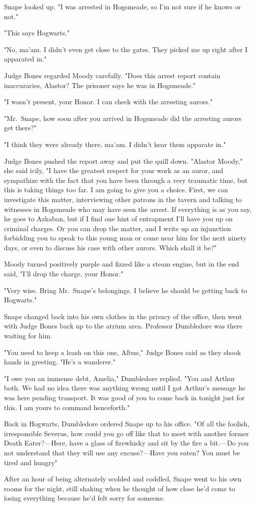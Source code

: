 Snape looked up. "I was arrested in Hogsmeade, so I'm not sure if he knows or not."

"This says Hogwarts."

"No, ma'am. I didn't even get close to the gates. They picked me up right after I apparated in."

Judge Bones regarded Moody carefully. "Does this arrest report contain inaccuracies, Alastor? The prisoner says he was in Hogsmeade."

"I wasn't present, your Honor. I can check with the arresting aurors."

"Mr.~Snape, how soon after you arrived in Hogsmeade did the arresting aurors get there?"

"I think they were already there, ma'am. I didn't hear them apparate in."

Judge Bones pushed the report away and put the quill down. "Alastor Moody," she said icily, "I have the greatest respect for your work as an auror, and sympathize with the fact that you have been through a very traumatic time, but this is taking things too far. I am going to give you a choice. First, we can investigate this matter, interviewing other patrons in the tavern and talking to witnesses in Hogsmeade who may have seen the arrest. If everything is as you say, he goes to Azkaban, but if I find one hint of entrapment I'll have you up on criminal charges. Or you can drop the matter, and I write up an injunction forbidding you to speak to this young man or come near him for the next ninety days, or even to discuss his case with other aurors. Which shall it be?"

Moody turned positively purple and fizzed like a steam engine, but in the end said, "I'll drop the charge, your Honor."

"Very wise. Bring Mr.~Snape's belongings. I believe he should be getting back to Hogwarts."

Snape changed back into his own clothes in the privacy of the office, then went with Judge Bones back up to the atrium area. Professor Dumbledore was there waiting for him.

"You need to keep a leash on this one, Albus," Judge Bones said as they shook hands in greeting. "He's a wanderer."

"I owe you an immense debt, Amelia," Dumbledore replied. "You and Arthur both. We had no idea there was anything wrong until I got Arthur's message he was here pending transport. It was good of you to come back in tonight just for this. I am yours to command henceforth."

Back in Hogwarts, Dumbledore ordered Snape up to his office. "Of all the foolish, irresponsible{\el} Severus, how could you go off like that to meet with another former Death Eater?—Here, have a glass of firewhisky and sit by the fire a bit.—Do you not understand that they will use any excuse{\el}?—Have you eaten? You must be tired and hungry{\el}"

After an hour of being alternately scolded and coddled, Snape went to his own rooms for the night, still shaking when he thought of how close he'd come to losing everything because he'd felt sorry for someone. 


